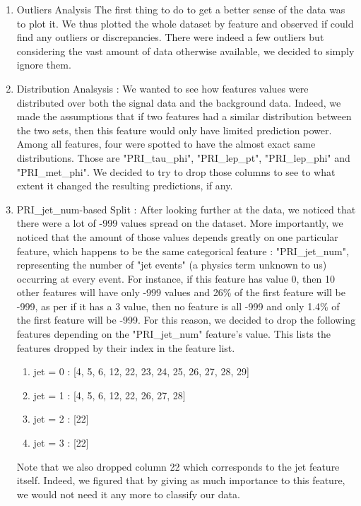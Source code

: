 \documentclass[10pt,conference,compsocconf]{IEEEtran}
\begin{document}
\begin{enumerate}
\item Outliers Analysis
The first thing to do to get a better sense of the data was to plot it. We thus plotted the whole dataset by feature and observed if could find any outliers or discrepancies. There were indeed a few outliers but considering the vast amount of data otherwise available, we decided to simply ignore them.

\item Distribution Analsysis :
We wanted to see how features values were distributed over both the signal data and the background data. Indeed, we made the assumptions that if two features had a similar distribution between the two sets, then this feature would only have limited prediction power. Among all features, four were spotted to have the almost exact same distributions. Those are "PRI\_tau\_phi", "PRI\_lep\_pt", "PRI\_lep\_phi" and "PRI\_met\_phi". We decided to try to drop those columns to see to what extent it changed the resulting predictions, if any.

\item PRI\_jet\_num-based Split :
After looking further at the data, we noticed that there were a lot of -999 values spread on the dataset. More importantly, we noticed that the amount of those values depends greatly on one particular feature, which happens to be the same categorical feature : "PRI\_jet\_num", representing the number of "jet events" (a physics term unknown to us) occurring at every event. For instance, if this feature has value 0, then 10 other features will have only -999 values and 26\% of the first feature will be -999, as per if it has a 3 value, then no feature is all -999 and only 1.4\% of the first feature will be -999.
For this reason, we decided to drop the following features depending on the "PRI\_jet\_num" feature's value. This lists the features dropped by their index in the feature list.
\begin{enumerate}
\item jet = 0 : [4, 5, 6, 12, 22, 23, 24, 25, 26, 27, 28, 29]
\item jet = 1 : [4, 5, 6, 12, 22, 26, 27, 28]
\item jet = 2 : [22]
\item jet = 3 : [22]
\end{enumerate}
Note that we also dropped column 22 which corresponds to the jet feature itself. Indeed, we figured that by giving as much importance to this feature, we would not need it any more to classify our data.


\end{enumerate}
\end{document}
